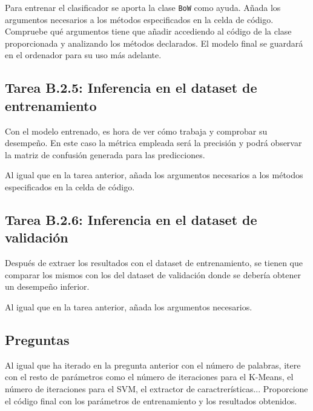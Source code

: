 Para entrenar el clasificador se aporta la clase \texttt{BoW} como ayuda. Añada los argumentos necesarios a los métodos especificados en la celda de código. Compruebe qué argumentos tiene que añadir accediendo al código de la clase proporcionada y analizando los métodos declarados. El modelo final se guardará en el ordenador para su uso más adelante.

\subsection*{Tarea B.2.5: Inferencia en el dataset de entrenamiento}

Con el modelo entrenado, es hora de ver cómo trabaja y comprobar su desempeño. En este caso la métrica empleada será la precisión y podrá observar la matriz de confusión generada para las predicciones.

Al igual que en la tarea anterior, añada los argumentos necesarios a los métodos especificados en la celda de código.

\subsection*{Tarea B.2.6: Inferencia en el dataset de validación}

Después de extraer los resultados con el dataset de entrenamiento, se tienen que comparar los mismos con los del dataset de validación donde se debería obtener un desempeño inferior.

Al igual que en la tarea anterior, añada los argumentos necesarios.


\subsection*{Preguntas}


\begin{tcolorbox}[colback=gray!10, colframe=gray!30, coltitle=black, title=\textbf Pregunta B.2: En busca de los mejores parámetros, halign=left]
Al igual que ha iterado en la pregunta anterior con el número de palabras, itere con el resto de parámetros como el número de iteraciones para el K-Means, el número de iteraciones para el SVM, el extractor de caractrerísticas... Proporcione el código final con los parámetros de entrenamiento y los resultados obtenidos.
\end{tcolorbox}
